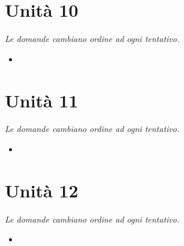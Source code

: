 \documentclass[12pt, a4paper]{report}
\begin{document}
\chapter{Unità 10}
    \textit{Le domande cambiano ordine ad ogni tentativo.}
    \begin{itemize}
        \item 
    \end{itemize}
\chapter{Unità 11}
    \textit{Le domande cambiano ordine ad ogni tentativo.}
    \begin{itemize}
        \item 
    \end{itemize}
\chapter{Unità 12}
    \textit{Le domande cambiano ordine ad ogni tentativo.}
    \begin{itemize}
        \item 
    \end{itemize}
\end{document}
